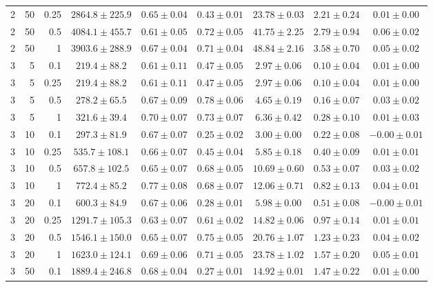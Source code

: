\begin{table}[htbp]
\begin{tabular}{@{}rrrcccccc@{}}
2 & 50 & 0.25 & $2864.8 \pm 225.9$ & $0.65 \pm 0.04$ & $0.43 \pm 0.01$ & $23.78 \pm 0.03$ & $2.21 \pm 0.24$ & $0.01 \pm 0.00$ \\
2 & 50 & 0.5 & $4084.1 \pm 455.7$ & $0.61 \pm 0.05$ & $0.72 \pm 0.05$ & $41.75 \pm 2.25$ & $2.79 \pm 0.94$ & $0.06 \pm 0.02$ \\
2 & 50 & 1 & $3903.6 \pm 288.9$ & $0.67 \pm 0.04$ & $0.71 \pm 0.04$ & $48.84 \pm 2.16$ & $3.58 \pm 0.70$ & $0.05 \pm 0.02$ \\
\midrule
3 & 5 & 0.1 & $219.4 \pm 88.2$ & $0.61 \pm 0.11$ & $0.47 \pm 0.05$ & $2.97 \pm 0.06$ & $0.10 \pm 0.04$ & $0.01 \pm 0.00$ \\
3 & 5 & 0.25 & $219.4 \pm 88.2$ & $0.61 \pm 0.11$ & $0.47 \pm 0.05$ & $2.97 \pm 0.06$ & $0.10 \pm 0.04$ & $0.01 \pm 0.00$ \\
3 & 5 & 0.5 & $278.2 \pm 65.5$ & $0.67 \pm 0.09$ & $0.78 \pm 0.06$ & $4.65 \pm 0.19$ & $0.16 \pm 0.07$ & $0.03 \pm 0.02$ \\
3 & 5 & 1 & $321.6 \pm 39.4$ & $0.70 \pm 0.07$ & $0.73 \pm 0.07$ & $6.36 \pm 0.42$ & $0.28 \pm 0.10$ & $0.01 \pm 0.03$ \\
3 & 10 & 0.1 & $297.3 \pm 81.9$ & $0.67 \pm 0.07$ & $0.25 \pm 0.02$ & $3.00 \pm 0.00$ & $0.22 \pm 0.08$ & $-0.00 \pm 0.01$ \\
3 & 10 & 0.25 & $535.7 \pm 108.1$ & $0.66 \pm 0.07$ & $0.45 \pm 0.04$ & $5.85 \pm 0.18$ & $0.40 \pm 0.09$ & $0.01 \pm 0.01$ \\
3 & 10 & 0.5 & $657.8 \pm 102.5$ & $0.65 \pm 0.07$ & $0.68 \pm 0.05$ & $10.69 \pm 0.60$ & $0.53 \pm 0.07$ & $0.03 \pm 0.02$ \\
3 & 10 & 1 & $772.4 \pm 85.2$ & $0.77 \pm 0.08$ & $0.68 \pm 0.07$ & $12.06 \pm 0.71$ & $0.82 \pm 0.13$ & $0.04 \pm 0.01$ \\
3 & 20 & 0.1 & $600.3 \pm 84.9$ & $0.67 \pm 0.06$ & $0.28 \pm 0.01$ & $5.98 \pm 0.00$ & $0.51 \pm 0.08$ & $-0.00 \pm 0.01$ \\
3 & 20 & 0.25 & $1291.7 \pm 105.3$ & $0.63 \pm 0.07$ & $0.61 \pm 0.02$ & $14.82 \pm 0.06$ & $0.97 \pm 0.14$ & $0.01 \pm 0.01$ \\
3 & 20 & 0.5 & $1546.1 \pm 150.0$ & $0.65 \pm 0.07$ & $0.75 \pm 0.05$ & $20.76 \pm 1.07$ & $1.23 \pm 0.23$ & $0.04 \pm 0.02$ \\
3 & 20 & 1 & $1623.0 \pm 124.1$ & $0.69 \pm 0.06$ & $0.71 \pm 0.05$ & $23.78 \pm 1.02$ & $1.57 \pm 0.20$ & $0.05 \pm 0.01$ \\
3 & 50 & 0.1 & $1889.4 \pm 246.8$ & $0.68 \pm 0.04$ & $0.27 \pm 0.01$ & $14.92 \pm 0.01$ & $1.47 \pm 0.22$ & $0.01 \pm 0.00$ \\

\end{tabular}
\end{table}
